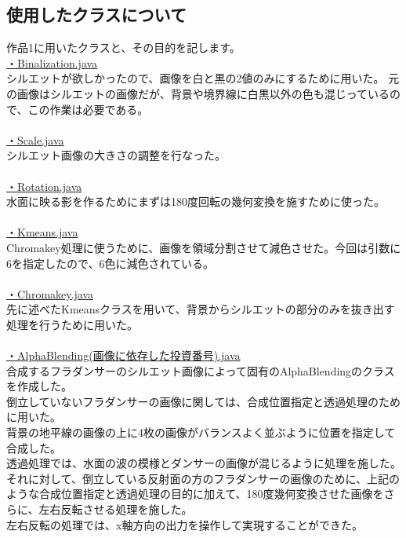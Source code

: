 \documentclass{jsarticle}
\begin{document}
\subsection{使用したクラスについて}
作品1に用いたクラスと、その目的を記します。
\\
\underline{・Binalization.java}\\
シルエットが欲しかったので、画像を白と黒の2値のみにするために用いた。
元の画像はシルエットの画像だが、背景や境界線に白黒以外の色も混じっているので、この作業は必要である。
\\
\\
\underline{・Scale.java}\\
シルエット画像の大きさの調整を行なった。
\\
\\
\underline{・Rotation.java}\\
水面に映る影を作るためにまずは180度回転の幾何変換を施すために使った。
\\
\\
\underline{・Kmeans.java}\\
Chromakey処理に使うために、画像を領域分割させて減色させた。今回は引数に6を指定したので、6色に減色されている。
\\
\\
\underline{・Chromakey.java}\\
先に述べたKmeansクラスを用いて、背景からシルエットの部分のみを抜き出す処理を行うために用いた。
\\
\\
\underline{・AlphaBlending(画像に依存した投資番号).java}\\
合成するフラダンサーのシルエット画像によって固有のAlphaBlendingのクラスを作成した。\\
倒立していないフラダンサーの画像に関しては、合成位置指定と透過処理のために用いた。\\背景の地平線の画像の上に4枚の画像がバランスよく並ぶように位置を指定して合成した。\\
透過処理では、水面の波の模様とダンサーの画像が混じるように処理を施した。\\
それに対して、倒立している反射面の方のフラダンサーの画像のために、上記のような合成位置指定と透過処理の目的に加えて、180度幾何変換させた画像をさらに、左右反転させる処理を施した。\\
左右反転の処理では、x軸方向の出力を操作して実現することができた。\\
\end{document}
